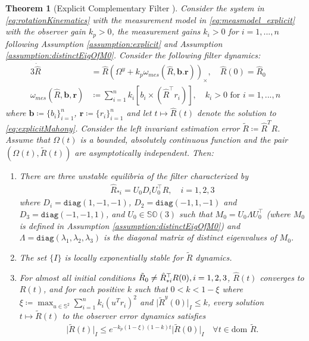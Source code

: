 \documentclass{article}
\newcommand{\dom}{\text{dom }}
\newcommand{\SOthree}{\mathbb{SO}(3)}
\newcommand{\Omegay}{\Omega^y}
\newtheorem{theorem}{Theorem}
\newcommand{\brackets}[1]{\left(#1\right)}
\newcommand{\Rtilde}{\tilde{R}}
\newcommand{\normSOthree}[1]{{{\vert}#1 {\vert}_I}}
\newcommand{\expo}[1]{e^{#1}}
\begin{document}
\begin{theorem}[Explicit Complementary Filter {\cite[Theorem 5.1]{mahony_complementaryFilter}}]\label{theorem:explicitMahony}
Consider the system in \eqref{eq:rotationKinematics} with the measurement model in \eqref{eq:measmodel_explicit} with the observer gain $k_p > 0$, the measurement gains $k_i>0$ for $i=1,...,n$ following Assumption \ref{assumption:explicit} and Assumption \ref{assumption:distinctEigOfM0}. Consider the following filter dynamics:
\begin{alignat}{3}\label{eq:explicitMahony}
    \dot{\hat{R}} &= \hat{R}\brackets{\Omegay + k_p\omega_{mes}(\hat{R}, \mathbf{b}. \mathbf{r})}_\times, \quad \hat{R}(0) = \hat{R}_0\\
    \omega_{mes}(\hat{R}, \mathbf{b}, \mathbf{r})&\coloneqq \sum_{i=1}^n k_i \left[b_i\times (\hat{R}^\top r_i)\right],\quad k_i> 0 \text{ for } i=1,...,n
\end{alignat}
where $\mathbf{b}\coloneqq \{b_i\}_{i=1}^n$, $\mathbf{r}\coloneqq \{r_i\}_{i=1}^n$ and let $t\mapsto \hat{R}(t)$ denote the solution to \eqref{eq:explicitMahony}. Consider the left invariant estimation error $\Rtilde\coloneqq \hat{R}^TR$. Assume that $\Omega(t)$ is a bounded, absolutely continuous function and the pair $(\Omega(t), \Rtilde(t))$ are asymptotically independent. Then:
\begin{enumerate}
    \item There are three unstable equilibria of the filter characterized by
    \begin{align*}
        \hat{R}_{*i} = U_0D_iU_0^\top R, \quad i=1,2,3
    \end{align*}
    where $D_i = \texttt{diag}(1,-1,-1)$, $D_2 = \texttt{diag}(-1,1,-1)$ and $D_3=\texttt{diag}(-1,-1,1)$, and $U_0\in\SOthree$ such that $M_0 = U_0\Lambda U_0^\top $ (where $M_0$ is defined in Assumption \ref{assumption:distinctEigOfM0}) and $\Lambda = \texttt{diag}(\lambda_1, \lambda_2, \lambda_3)$ is the diagonal matrix of distinct eigenvalues of $M_0$. \label{item:a-mahony-ecf}
    \item The set $\{I\}$ is locally exponentially stable for $\Rtilde$ dynamics. \label{item:b-mahony-ecf}
    \item For almost all initial conditions $\Tilde{R}_0\neq \hat{R}^\top _{*i}R(0), i=1,2,3$, $\hat{R}(t)$ converges to $R(t)$, and for each positive $k$ such that $0 < k < 1-\xi$ where $\xi \coloneqq \max_{u\in\mathbb{S}^2}\sum_{i=1}^n k_i(u^Tr_i)^2$ and $\normSOthree{\Rtilde^y(0)}\leq k$, every solution $t\mapsto \Rtilde(t)$ to the observer error dynamics satisfies \label{item:c-mahony-ecf}
    \begin{align} \label{eq:localExpStability_ECF}
    \normSOthree{\Rtilde(t)}\leq \expo{-k_p(1-\xi)(1-k)t}\normSOthree{\Rtilde(0)}\quad \forall t\in\dom\Rtilde.
\end{align}
\end{enumerate}
\end{theorem}
\end{document}
